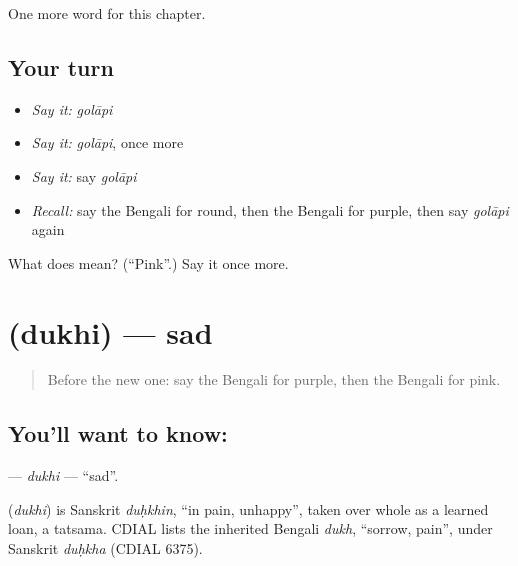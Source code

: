\begin{grammarlens}[title={What you've built}]
One more word for this chapter.
\end{grammarlens}

\subsection*{Your turn}
\begin{itemize}
\raggedright
  \item \emph{Say it:} \emph{golāpi}
  \item \emph{Say it:} \emph{golāpi}, once more
  \item \emph{Say it:} say \emph{golāpi}
  \item \emph{Recall:} say the Bengali for round, then the Bengali for purple, then say \emph{golāpi} again
\end{itemize}

\begin{tcolorbox}[breakable,colback=teal!4,colframe=teal!35!black,title={Before you move on}]
What does  mean? (\textquotedblleft{}Pink\textquotedblright{}.) Say it once more.
\end{tcolorbox}
\section[\texorpdfstring{\bn{দুঃখী} (dukhi)}{দুঃখী (dukhi)}]{ (dukhi) — sad}

\label{lesson:BN-C137-dukhi}



\begin{quote}
Before the new one: say the Bengali for purple, then the Bengali for pink.
\end{quote}

\subsection*{You'll want to know: }
\textbf{} — \emph{dukhi} — \textquotedblleft{}sad\textquotedblright{}.

\begin{cousinweb}
\textbf{} (\emph{dukhi}) is Sanskrit \emph{duḥkhin}, \textquotedblleft{}in pain, unhappy\textquotedblright{}, taken over whole as a learned loan, a tatsama. CDIAL lists the inherited Bengali \emph{dukh}, \textquotedblleft{}sorrow, pain\textquotedblright{}, under Sanskrit \emph{duḥkha} (CDIAL 6375).
\end{cousinweb}

